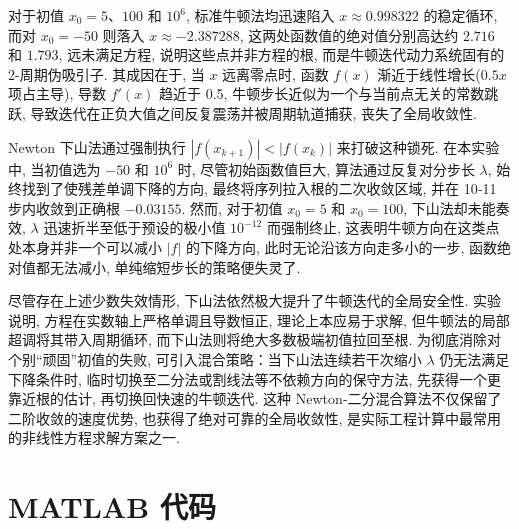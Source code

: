 \documentclass[12pt,a4paper]{ctexart}
\begin{document}
对于初值 $x_0=5$、$100$ 和 $10^6$, 标准牛顿法均迅速陷入 $x\approx 0.998322$ 的稳定循环, 而对 $x_0=-50$ 则落入 $x\approx -2.387288$, 这两处函数值的绝对值分别高达约 $2.716$ 和 $1.793$, 远未满足方程, 说明这些点并非方程的根, 而是牛顿迭代动力系统固有的 2-周期伪吸引子. 其成因在于, 当 $x$ 远离零点时, 函数 $f(x)$ 渐近于线性增长($0.5x$ 项占主导), 导数 $f'(x)$ 趋近于 0.5, 牛顿步长近似为一个与当前点无关的常数跳跃, 导致迭代在正负大值之间反复震荡并被周期轨道捕获, 丧失了全局收敛性. 

Newton 下山法通过强制执行 $|f(x_{k+1})|<|f(x_k)|$ 来打破这种锁死. 在本实验中, 当初值选为 $-50$ 和 $10^6$ 时, 尽管初始函数值巨大, 算法通过反复对分步长 $\lambda$, 始终找到了使残差单调下降的方向, 最终将序列拉入根的二次收敛区域, 并在 10‑11 步内收敛到正确根 $-0.03155$. 然而, 对于初值 $x_0=5$ 和 $x_0=100$, 下山法却未能奏效, $\lambda$ 迅速折半至低于预设的极小值 $10^{-12}$ 而强制终止, 这表明牛顿方向在这类点处本身并非一个可以减小 $|f|$ 的下降方向, 此时无论沿该方向走多小的一步, 函数绝对值都无法减小, 单纯缩短步长的策略便失灵了. 

尽管存在上述少数失效情形, 下山法依然极大提升了牛顿迭代的全局安全性. 实验说明, 方程在实数轴上严格单调且导数恒正, 理论上本应易于求解, 但牛顿法的局部超调将其带入周期循环, 而下山法则将绝大多数极端初值拉回至根. 为彻底消除对个别“顽固”初值的失败, 可引入混合策略：当下山法连续若干次缩小 $\lambda$ 仍无法满足下降条件时, 临时切换至二分法或割线法等不依赖方向的保守方法, 先获得一个更靠近根的估计, 再切换回快速的牛顿迭代. 这种 Newton‑二分混合算法不仅保留了二阶收敛的速度优势, 也获得了绝对可靠的全局收敛性, 是实际工程计算中最常用的非线性方程求解方案之一. 
\appendix
\section{MATLAB 代码}
\end{document}

